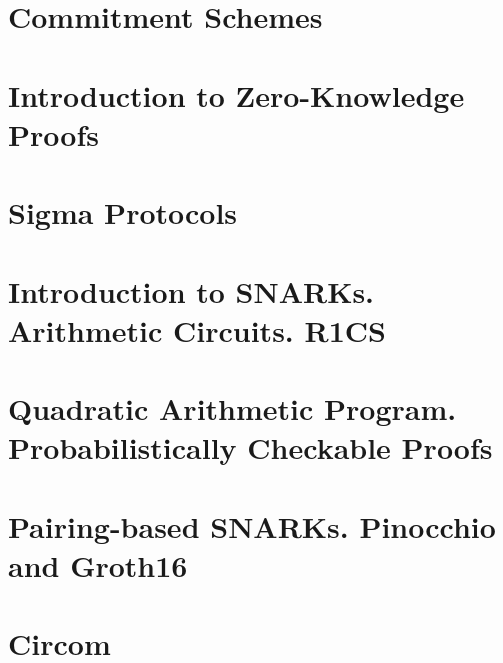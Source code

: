 \documentclass{zkdl-template}
\begin{document}


\chapter{Commitment Schemes}



\chapter{Introduction to Zero-Knowledge Proofs}



\chapter{Sigma Protocols}



\chapter{Introduction to SNARKs. Arithmetic Circuits. R1CS}

\label{section:circuits}

\chapter{Quadratic Arithmetic Program. Probabilistically Checkable Proofs}



\chapter{Pairing-based SNARKs. Pinocchio and Groth16}



\chapter{Circom}


\end{document}

